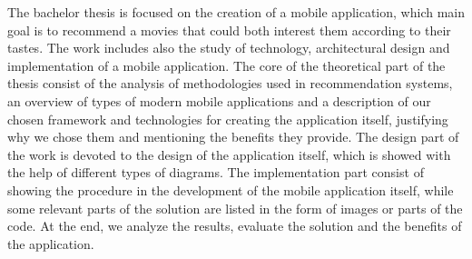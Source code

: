The bachelor thesis is focused on the creation of a mobile application, which main goal is to recommend a movies that could both interest them according to their tastes. The work includes also the study of technology, architectural design and implementation of a mobile application.
The core of the theoretical part of the thesis consist of the analysis of methodologies used in recommendation systems, an overview of types of modern mobile applications and a description of our chosen framework and technologies for creating the application itself, justifying why we chose them and mentioning the benefits they provide.
The design part of the work is devoted to the design of the application itself, which is showed with the help of different types of diagrams.
The implementation part consist of showing the procedure in the development of the mobile application itself, while some relevant parts of the solution are listed in the form of images or parts of the code. At the end, we analyze the results, evaluate the solution and the benefits of the application.